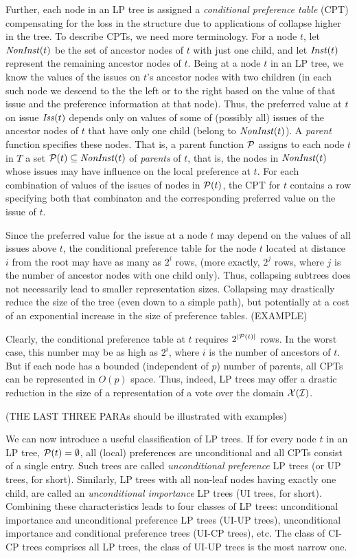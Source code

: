Further, each node in an LP tree is assigned a \emph{conditional 
preference table} (CPT) compensating for the loss in the structure due
to applications of collapse higher in the tree. To describe CPTs, we 
need more terminology. For a node $t$, 
let $\mathit{NonInst}(t)$ be the set of ancestor nodes of $t$ 
with just one child, and let $\mathit{Inst}(t)$ represent the remaining ancestor 
nodes of $t$. Being at a node $t$ in an LP tree, we know the values of the 
issues on $t$'s ancestor nodes with two children (in each such node we 
descend to the the left or to the right based on the value of that 
issue and the preference information at that node). Thus, the preferred 
value at $t$ on issue $\mathit{Iss}(t)$ depends only on values of some of 
(possibly all) issues of the ancestor nodes of $t$ that have only one 
child (belong to $\mathit{NonInst}(t)$). A \emph{parent} function specifies 
these nodes. That is, a parent function $\mathcal{P}$ assigns to each node $t$ 
in $T$ a set $\mathcal{P}(t)\subseteq \mathit{NonInst}(t)$ of \emph{parents} of $t$, that
is, the nodes in $\mathit{NonInst}(t)$ whose issues may have influence on the
local preference at $t$. For each combination of values of the issues
of nodes in $\mathcal{P}(t)$, the CPT for $t$ contains a row specifying both
that combinaton and the corresponding preferred value on the issue
of $t$.

Since the preferred value for the issue at a node $t$ may depend on 
the values of all issues above $t$, the conditional preference table 
for the node $t$ located at distance $i$ from the root may have as 
many as $2^i$ rows, (more exactly, $2^j$ rows, where $j$ is the number 
of ancestor nodes with one child only). Thus, collapsing subtrees does 
not necessarily lead to smaller representation sizes. Collapsing may 
drastically reduce the size of the tree (even down to a simple path),
but potentially at a cost of an exponential increase in the size of preference 
tables. (EXAMPLE)

Clearly, the conditional preference table at $t$ requires
$2^{|\mathcal{P}(t)|}$ rows. In the worst case, this number may be as high
as $2^i$, where $i$ is the number of ancestors of $t$. But if each 
node has a bounded (independent of $p$) number of parents, all CPTs
can be represented in $O(p)$ space. Thus, indeed, LP trees may offer a
drastic reduction in the size of a representation of a vote over
the domain $\mathcal{X}(\mathcal{I})$.

(THE LAST THREE PARAs should be illustrated with examples)

We can now introduce a useful classification of LP trees. If for every 
node $t$ in an LP tree, $\mathcal{P}(t)=\emptyset$, all (local) preferences are
unconditional and all CPTs consist of a single entry. Such trees are 
called \emph{unconditional preference} LP trees (or UP trees, for short). 
Similarly, LP trees with all non-leaf nodes having exactly one child, 
are called an \emph{unconditional importance} LP trees (UI trees, for 
short). Combining these characteristics leads to four classes of LP trees:
unconditional importance and unconditional preference LP trees (UI-UP 
trees), unconditional importance and conditional preference trees (UI-CP 
trees), etc. The class of CI-CP trees comprises all LP trees, the class 
of UI-UP trees is the most narrow one. 

